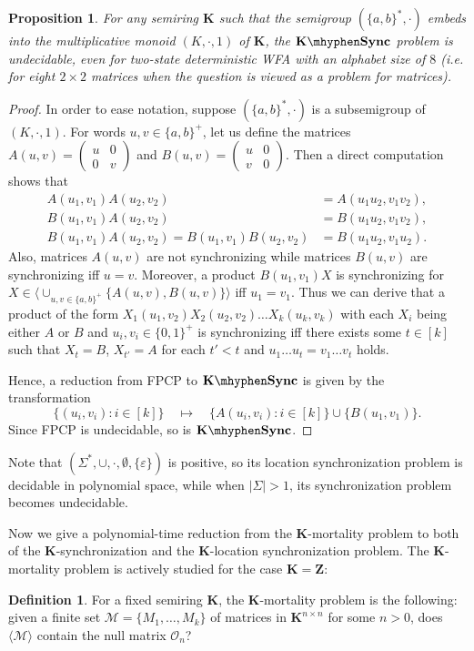 \documentclass[submission,copyright,creativecommons]{eptcs}
\def\bK{{\mathbf{K}}}
\def\bZ{{\mathbf{Z}}}
\theoremstyle{plain}
\newtheorem{proposition}{Proposition}
\theoremstyle{definition}
\newtheorem{definition}{Definition}{}
\theoremstyle{remark}
\begin{document}
\begin{proposition}
For any semiring $\bK$ such that the semigroup $(\{a,b\}^*,\cdot)$ embeds into the multiplicative monoid $(K,\cdot,1)$ of $\bK$,
the $\bK\mhyphen\mathbf{Sync}$ problem is undecidable, even for two-state deterministic WFA with an alphabet size of
$8$ (i.e. for eight $2\times 2$ matrices when the question is viewed as a problem for matrices).
\end{proposition}
\begin{proof}
In order to ease notation, suppose $(\{a,b\}^*,\cdot)$ is a subsemigroup of $(K,\cdot,1)$.
For words $u,v\in\{a,b\}^+$, let us define the matrices 
$A(u,v)=\left(\begin{array}{ll}u&0\\0&v\end{array}\right)$ and $B(u,v)=\left(\begin{array}{ll}u&0\\v&0\end{array}\right)$.
Then a direct computation shows that
\begin{align*}
A(u_1,v_1)A(u_2,v_2)&=A(u_1u_2,v_1v_2),\\
B(u_1,v_1)A(u_2,v_2)&=B(u_1u_2,v_1v_2),\\
B(u_1,v_1)A(u_2,v_2)=B(u_1,v_1)B(u_2,v_2)&=B(u_1u_2,v_1u_2).
\end{align*}
Also, matrices $A(u,v)$ are not synchronizing while matrices $B(u,v)$ are synchronizing iff $u=v$.
Moreover, a product $B(u_1,v_1)X$ is synchronizing for $X\in\langle\cup_{u,v\in\{a,b\}^+}\{A(u,v),B(u,v)\}\rangle$ iff $u_1=v_1$.
Thus we can derive that a product of the form  $X_1(u_1,v_2)X_2(u_2,v_2)\ldots X_k(u_k,v_k)$ with each $X_i$ being either $A$ or $B$
and $u_i,v_i\in\{0,1\}^+$ is synchronizing iff there exists some $t\in[k]$ such that $X_t=B$, $X_{t'}=A$ for each $t'<t$ and
$u_1\ldots u_t=v_1\ldots v_t$ holds.

Hence, a reduction from FPCP to $\bK\mhyphen\mathbf{Sync}$ is given by the transformation
\[\{(u_i,v_i):i\in[k]\}\quad\mapsto\quad\{A(u_i,v_i):i\in[k]\}\cup\{B(u_1,v_1)\}.\]
Since FPCP is undecidable, so is $\bK\mhyphen\mathbf{Sync}$.
\end{proof}

Note that $(\Sigma^*,\cup,\cdot,\emptyset,\{\varepsilon\})$ is positive, so its location synchronization problem is decidable in polynomial space, while when $|\Sigma|>1$, its synchronization problem becomes undecidable.

Now we give a polynomial-time reduction from the $\bK$-mortality problem to both of the $\bK$-synchronization and the $\bK$-location synchronization problem. The $\bK$-mortality problem is actively studied for the case $\bK=\bZ$:
\begin{definition}
For a fixed semiring $\bK$, the $\bK$-mortality problem is the following: given a finite set $\mathcal{M}=\{M_1,\ldots,M_k\}$
of matrices in $\bK^{n\times n}$ for some $n>0$, does $\langle \mathcal{M}\rangle$ contain the null matrix $\mathcal{O}_n$?
\end{definition}
\end{document}
